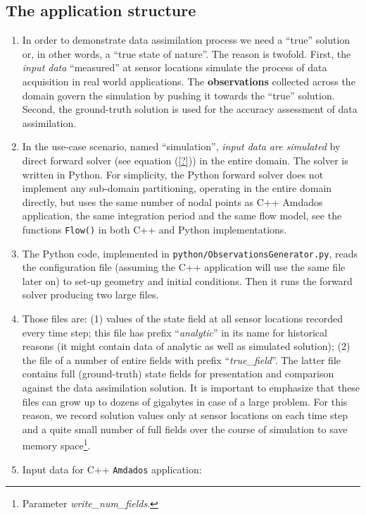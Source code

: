 \documentclass[]{article}
\begin{document}
\subsection{The application structure}
\begin{enumerate}
\item In order to demonstrate data assimilation process we need a ``true'' solution or, in other words, a ``true state of nature''. The reason is twofold. First, the \textit{input data} ``measured'' at sensor locations simulate the process of data acquisition in real world applications. The \textbf{observations} collected across the domain govern the simulation by pushing it towards the ``true'' solution. Second, the ground-truth solution is used for the accuracy assessment of data assimilation.
\item In the use-case scenario, named ``simulation'', \textit{input data are simulated} by direct forward solver (see equation (\ref{?})) in the entire domain. The solver is written in Python. For simplicity, the Python forward solver does not implement any sub-domain partitioning, operating in the entire domain directly, but uses the same number of nodal points as C++ Amdados application, the same integration period and the same flow model, see the functions \texttt{Flow()} in both C++ and Python implementations.
\item The Python code, implemented in \texttt{python/ObservationsGenerator.py}, reads the configuration file (assuming the C++ application will use the same file later on) to set-up geometry and initial conditions. Then it runs the forward solver producing two large files.
\item Those files are: (1) values of the state field at all sensor locations recorded every time step; this file has prefix ``\textit{analytic}'' in its name for historical reasons (it might contain data of analytic as well as simulated solution); (2) the file of a number of entire fields with prefix ``\textit{true\_field}''. The latter file contains full (ground-truth) state fields for presentation and comparison against the data assimilation solution. It is important to emphasize that these files can grow up to dozens of gigabytes in case of a large problem. For this reason, we record solution values only at sensor locations on each time step and a quite small number of full fields over the course of simulation to save memory space\footnote{Parameter \textit{write\_num\_fields}.}.
\item Input data for C++ \texttt{Amdados} application:

\end{enumerate}
\end{document}
